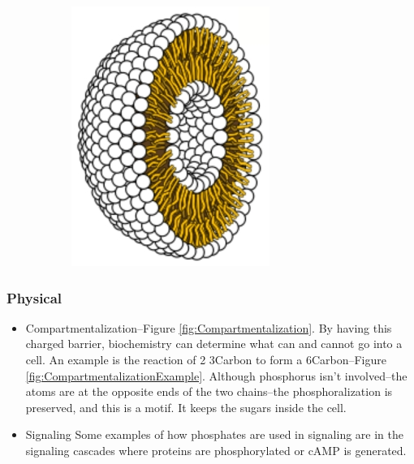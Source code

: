\documentclass[]{article}
\begin{document}
\begin{figure}[H]
\begin{subfigure}[t]{0.3\textwidth}
		\includegraphics[width=\textwidth]{PhosphoLipid3}
	\end{subfigure}
	
\end{figure}

\subsubsection{Physical}

\begin{itemize}
	\item Compartmentalization--Figure \ref{fig:Compartmentalization}. By having this charged barrier, biochemistry can determine what can and cannot go into a cell. An example is the reaction of 2 3Carbon to form a 6Carbon--Figure \ref{fig:CompartmentalizationExample}. Although phosphorus isn't involved--the atoms are at the opposite ends of the two chains--the phosphoralization is preserved, and this is a motif. It keeps the sugars inside the cell.
	\item Signaling Some examples of how phosphates are used in signaling are in the signaling cascades where proteins are phosphorylated or cAMP is generated.
\end{itemize}
\end{document}
